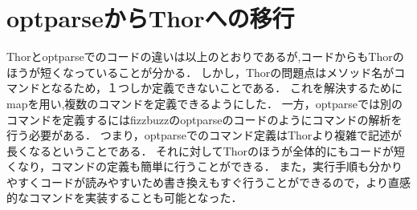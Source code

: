 \section{optparseからThorへの移行}
Thorとoptparseでのコードの違いは以上のとおりであるが,コードからもThorのほうが短くなっていることが分かる．
しかし，Thorの問題点はメソッド名がコマンドとなるため，１つしか定義できないことである．
これを解決するためにmapを用い,複数のコマンドを定義できるようにした．
一方，optparseでは別のコマンドを定義するにはfizzbuzzのoptparseのコードのようにコマンドの解析を行う必要がある．
つまり，optparseでのコマンド定義はThorより複雑で記述が長くなるということである．
それに対してThorのほうが全体的にもコードが短くなり，コマンドの定義も簡単に行うことができる．
また，実行手順も分かりやすくコードが読みやすいため書き換えもすぐ行うことができるので，より直感的なコマンドを実装することも可能となった．

